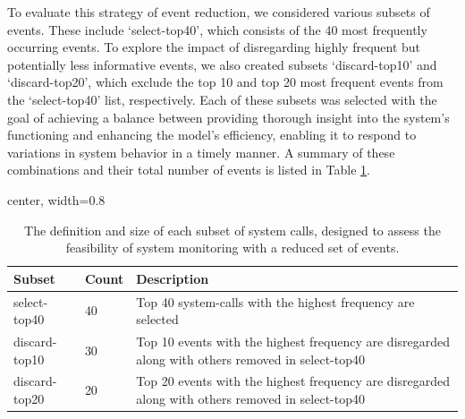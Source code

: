 \documentclass[preprint,12pt]{elsarticle}
\begin{document}
To evaluate this strategy of event reduction, we considered various subsets of events. These include `select-top40', which consists of the 40 most frequently occurring events. To explore the impact of disregarding highly frequent but potentially less informative events, we also created subsets `discard-top10' and `discard-top20', which exclude the top 10 and top 20 most frequent events from the `select-top40' list, respectively. Each of these subsets was selected with the goal of achieving a balance between providing thorough insight into the system's functioning and enhancing the model's efficiency, enabling it to respond to variations in system behavior in a timely manner. A summary of these combinations and their total number of events is listed in Table \ref{tab:subset_syscalls}.

\begin{table}[tb]
\caption{The definition and size of each subset of system calls, designed to assess the feasibility of system monitoring with a reduced set of events.}
\label{tab:subset_syscalls}
\centering
\renewcommand{\arraystretch}{1.3}
\begin{adjustbox}{center, width=0.8\textwidth}
\begin{tabular}{p{2.5cm}p{1cm}p{9cm}}  %
\hline \hline
Subset         & Count & Description                                                                                                                 \\ \hline
select-top40   & 40    & Top 40 system-calls with the highest frequency are selected                                                                                    \\
discard-top10   & 30    & Top 10 events with the highest frequency are disregarded along with others removed in select-top40                                            \\
discard-top20   & 20    & Top 20 events with the highest frequency are disregarded along with others removed in select-top40                                            \\ \hline\hline
\end{tabular}
\end{adjustbox}
\end{table}
\end{document}
